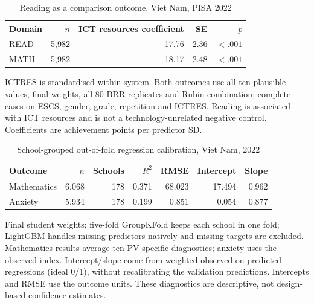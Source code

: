 \begin{table}[H]\centering\scriptsize
\caption{Reading as a comparison outcome, Viet Nam, PISA 2022}\label{tab:reading}
\begin{tabular}{@{}lrrrr@{}}
\toprule
Domain & $n$ & ICT resources coefficient & SE & $p$\\
\midrule
READ & 5,982 & 17.76 & 2.36 & $<.001$\\
MATH & 5,982 & 18.17 & 2.48 & $<.001$\\
\bottomrule
\end{tabular}
\par\smallskip\raggedright\footnotesize ICTRES is standardised within system. Both outcomes use all ten plausible values, final weights, all 80 BRR replicates and Rubin combination; complete cases on ESCS, gender, grade, repetition and ICTRES. Reading is associated with ICT resources and is not a technology-unrelated negative control. Coefficients are achievement points per predictor SD.
\end{table}

\begin{table}[H]\centering\scriptsize
\caption{School-grouped out-of-fold regression calibration, Viet Nam, 2022}\label{tab:calibration}
\begin{tabular}{@{}lrrrrrr@{}}
\toprule
Outcome & $n$ & Schools & $R^2$ & RMSE & Intercept & Slope\\
\midrule
Mathematics & 6,068 & 178 & 0.371 & 68.023 & 17.494 & 0.962\\
Anxiety & 5,934 & 178 & 0.199 & 0.851 & 0.054 & 0.877\\
\bottomrule
\end{tabular}
\par\smallskip\raggedright\footnotesize Final student weights; five-fold GroupKFold keeps each school in one fold; LightGBM handles missing predictors natively and missing targets are excluded. Mathematics results average ten PV-specific diagnostics; anxiety uses the observed index. Intercept/slope come from weighted observed-on-predicted regressions (ideal 0/1), without recalibrating the validation predictions. Intercepts and RMSE use the outcome units. These diagnostics are descriptive, not design-based confidence estimates.
\end{table}

